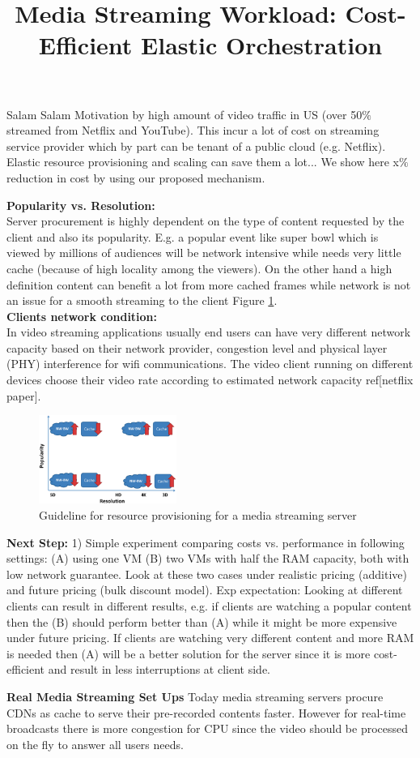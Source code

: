 \documentclass[12 pt]{article}
\begin{document}
\title{Media Streaming Workload: Cost-Efficient Elastic Orchestration}
\date{}
\maketitle
Salam Salam
Motivation by high amount of video traffic in US (over 50$\%$ streamed from Netflix and YouTube). This incur a lot of cost on streaming service provider which by part can be tenant of a public cloud (e.g. Netflix). Elastic resource provisioning and scaling can save them a lot... We show here x$\%$ reduction in cost by using our proposed mechanism. %

{\bf Popularity vs. Resolution:}\\
Server procurement is highly dependent on the type of content requested by the client and also its popularity. E.g. a popular event like super bowl which is viewed by millions of audiences will be network intensive while needs very little cache (because of high locality among the viewers). On the other hand a high definition content can benefit a lot from more cached frames while network is not an issue for a smooth streaming to the client Figure \ref{fig:spectrum}.
\\

{\bf Clients network condition:} \\
In video streaming applications usually end users can have very different network capacity based on their network provider, congestion level and physical layer (PHY) interference for wifi communications. The video client running on different devices choose their video rate according to estimated network capacity ref[netflix paper].

\begin{figure}[!htb]
\centering
\includegraphics[trim={1cm 0.6cm 5cm 1cm},width=0.4\textwidth]{./spectrum.eps}
\caption{Guideline for resource provisioning for a media streaming server}\label{fig:spectrum}
\end{figure}

{\bf Next Step:} 1) Simple experiment comparing costs vs. performance in following settings: (A) using one VM (B) two VMs with half the RAM capacity, both with low network guarantee. Look at these two cases under realistic pricing (additive) and future pricing (bulk discount model).
Exp expectation: Looking at different clients can result in different results, e.g. if clients are watching a popular content then the (B) should perform better than (A) while it might be more expensive under future pricing. If clients are watching very different content and more RAM is needed then (A) will be a better solution for the server since it is more cost-efficient and result in less interruptions at client side.



{\bf Real Media Streaming Set Ups} Today media streaming servers procure CDNs as cache to serve their pre-recorded contents faster. However for real-time broadcasts there is more congestion for CPU since the video should be processed on the fly to answer all users needs.
\end{document}
